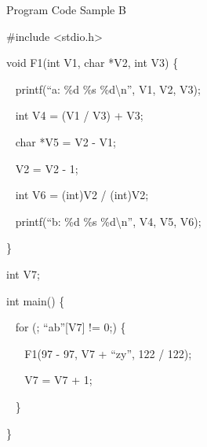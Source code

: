 \documentclass[12pt, a4paper, oneside]{article}
\begin{document}
\pagebreak

{Program Code Sample B}

{}

{\#include \textless{}stdio.h\textgreater{}}

{void F1(int V1, char *V2, int V3) \{}

{~ printf(``a: \%d \%s \%d\textbackslash{}n'', V1, V2, V3);}

{~ int V4 = (V1 / V3) + V3;}

{~ char *V5 = V2 - V1;}

{~ V2 = V2 - 1;}

{~ int V6 = (int)V2 / (int)V2;}

{~ printf(``b: \%d \%s \%d\textbackslash{}n'', V4, V5, V6);}

{\}}

{int V7;}

{int main() \{}

{~ for (; ``ab''{[}V7{]} != 0;) \{}

{~ ~ F1(97 - 97, V7 + ``zy'', 122 / 122);}

{~ ~ V7 = V7 + 1;}

{~ \}}

{\}}

{}

{}

{}

{}
\end{document}
